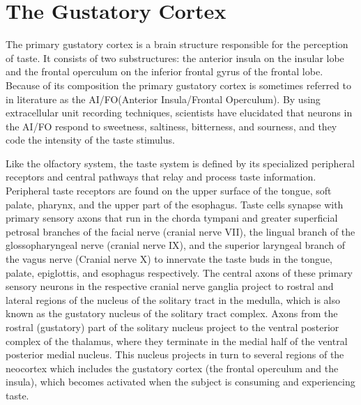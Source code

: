 \hypertarget{the-gustatory-cortex}{%
\section{The Gustatory Cortex}\label{the-gustatory-cortex}}

The primary gustatory cortex is a brain structure responsible for the perception of taste. It consists of two substructures: the anterior insula on the insular lobe and the frontal operculum on the inferior frontal gyrus of the frontal lobe. Because of its composition the primary gustatory cortex is sometimes referred to in literature as the AI/FO(Anterior Insula/Frontal Operculum). By using extracellular unit recording techniques, scientists have elucidated that neurons in the AI/FO respond to sweetness, saltiness, bitterness, and sourness, and they code the intensity of the taste stimulus.

Like the olfactory system, the taste system is defined by its specialized peripheral receptors and central pathways that relay and process taste information. Peripheral taste receptors are found on the upper surface of the tongue, soft palate, pharynx, and the upper part of the esophagus. Taste cells synapse with primary sensory axons that run in the chorda tympani and greater superficial petrosal branches of the facial nerve (cranial nerve VII), the lingual branch of the glossopharyngeal nerve (cranial nerve IX), and the superior laryngeal branch of the vagus nerve (Cranial nerve X) to innervate the taste buds in the tongue, palate, epiglottis, and esophagus respectively. The central axons of these primary sensory neurons in the respective cranial nerve ganglia project to rostral and lateral regions of the nucleus of the solitary tract in the medulla, which is also known as the gustatory nucleus of the solitary tract complex. Axons from the rostral (gustatory) part of the solitary nucleus project to the ventral posterior complex of the thalamus, where they terminate in the medial half of the ventral posterior medial nucleus. This nucleus projects in turn to several regions of the neocortex which includes the gustatory cortex (the frontal operculum and the insula), which becomes activated when the subject is consuming and experiencing taste.

